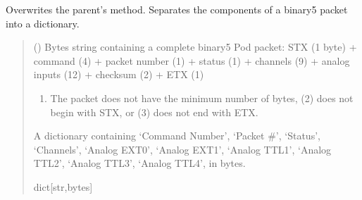 \documentclass[letterpaper,10pt,english]{sphinxmanual}
\begin{document}
\begin{fulllineitems}
\begin{fulllineitems}
\label{\detokenize{PodDevice_8401HR:PodDevice_8401HR.POD_8401HR.UnpackPODpacket_Binary}}
\pysigstartsignatures
{}
\pysigstopsignatures
\sphinxAtStartPar
Overwrites the parent’s method. Separates the components of a binary5 packet into a dictionary.
\begin{quote}\begin{description}
\sphinxAtStartPar
{} () \textendash{} Bytes string containing a complete binary5 Pod packet:  STX (1 byte)                 + command (4) + packet number (1) + status (1) + channels (9) + analog inputs (12)                 + checksum (2) + ETX (1)

\sphinxAtStartPar
{} \textendash{} \begin{enumerate}
%
\item {} 
\sphinxAtStartPar
The packet does not have the minimum number of bytes, (2) does not begin                 with STX, or (3) does not end with ETX.

\end{enumerate}


\sphinxAtStartPar
A dictionary containing ‘Command Number’, ‘Packet \#’, ‘Status’, ‘Channels’,                 ‘Analog EXT0’, ‘Analog EXT1’, ‘Analog TTL1’, ‘Analog TTL2’, ‘Analog TTL3’, ‘Analog TTL4’,                 in bytes.

\sphinxAtStartPar
dict{[}str,bytes{]}

\end{description}\end{quote}

\end{fulllineitems}



\end{fulllineitems}
\end{document}
